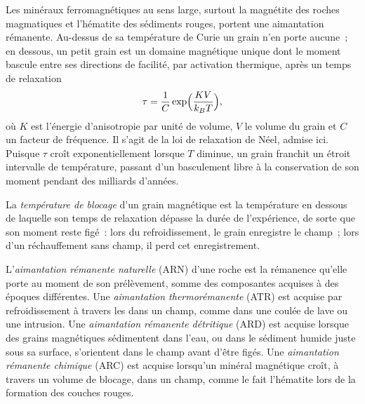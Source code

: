 Les minéraux ferromagnétiques au sens large, surtout la magnétite des roches magmatiques
et l'hématite des sédiments rouges, portent une aimantation rémanente. Au-dessus de sa température de Curie
un grain n'en porte aucune~; en dessous, un petit grain est un domaine magnétique unique dont
le moment bascule entre ses directions de facilité, par activation thermique, après un
temps de relaxation
\[
  \tau = \frac1C\exp\Bigl(\frac{K V}{k_B T}\Bigr),
\]
où $K$ est l'énergie d'anisotropie par unité de volume, $V$ le volume du grain
et $C$ un facteur de fréquence. Il s'agit de la loi de relaxation de Néel, admise ici. Puisque
$\tau$ croît exponentiellement lorsque $T$ diminue, un grain franchit un étroit intervalle
de température, passant d'un basculement libre à la conservation de son moment pendant des
milliards d'années.

\begin{definition}\label{def:b3:palaeomagnetism:blocking}
La \emph{température de blocage} d'un grain magnétique
est la température en dessous de laquelle son temps de relaxation dépasse la durée de
l'expérience, de sorte que son moment reste figé~: lors du refroidissement, le grain
enregistre le champ~; lors d'un réchauffement sans champ, il perd cet
enregistrement.
\end{definition}

\begin{definition}\label{def:b3:palaeomagnetism:nrm}
L'\emph{aimantation rémanente naturelle}
(ARN) d'une roche est la rémanence qu'elle porte au moment de son prélèvement, somme des
composantes acquises à des époques différentes. Une \emph{aimantation
thermorémanente} (ATR) est acquise par refroidissement à travers les
 dans un champ, comme dans une coulée de lave ou une
intrusion. Une \emph{aimantation rémanente détritique}
(ARD) est acquise lorsque des grains magnétiques sédimentent dans l'eau, ou dans
le sédiment humide juste sous sa surface, s'orientent dans le champ avant d'être
figés. Une \emph{aimantation rémanente chimique}
(ARC) est acquise lorsqu'un minéral magnétique croît, à travers un
volume de blocage, dans un champ, comme le fait l'hématite lors de la formation des couches rouges.
\end{definition}

